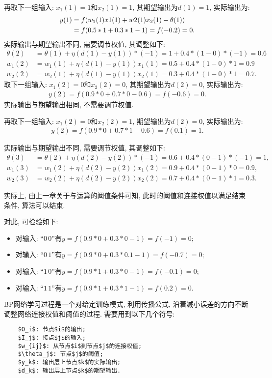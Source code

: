 再取下一组输入: $x_1(1)=1$和$x_2(1)=1$, 其期望输出为$d(1)=1$, 实际输出为:
\begin{align}
  y(1)&=f(w_1(1) x1(1)+ w2(1) x_2(1)-\theta(1))\notag\\
      &=f(0.5*1+0.3*1-1)=f(-0.2)=0.
\end{align}
实际输出与期望输出不同, 需要调节权值, 其调整如下:
\begin{align}
\theta(2)&=\theta(1)+\eta (d(1)- y(1))*(-1)=1+0.4*(1-0)*(-1)=0.6\\
    w_1(2)&=w_1(1)+\eta (d(1)- y(1))x_1(1)=0.5+0.4*(1-0)*1=0.9\\
    w_2(2)&=w_2(1)+\eta (d(1)- y(1))x_2(1)=0.3+0.4*(1-0)*1=0.7.
\end{align}
取下一组输入: $x_1(2)=0$和$x_2(2)=0$, 其期望输出为$d(2)=0$, 实际输出为:
\begin{align}
    y(2)=f(0.9*0+0.7*0-0.6)=f(-0.6)=0.
\end{align}
实际输出与期望输出相同, 不需要调节权值.

再取下一组输入: $x_1(2)=0$和$x_2(2)=1$, 期望输出为$d(2)=0$, 实际输出为:
\begin{align}
  y(2)=f(0.9*0+0.7*1-0.6)=f(0.1)=1.
\end{align}

实际输出与期望输出不同, 需要调节权值, 其调整如下:
\begin{align}
\theta(3)&=\theta(2)+\eta (d(2)- y(2))*(-1)=0.6+0.4*(0-1)*(-1)=1,\\
   w_1(3)&=w_1(2)+\eta (d(2)- y(2))x_1(2)=0.9+0.4*(0-1)*0=0.9,\\
   w_2(3)&=w_2(2)+\eta (d(2)- y(2))x_2(2)=0.7+0.4*(0-1)*1=0.3.
\end{align}

实际上, 由上一章关于与运算的阈值条件可知, 此时的阈值和连接权值以满足结束条件, 算法可以结束.

对此, 可检验如下:
\begin{itemize}
\item 对输入: “$0\, 0$”有$y=f(0.9*0+0.3*0-1)=f(-1)=0$;
\item 对输入: “$0\, 1$”有$y=f(0.9*0+0.3*0.1-1)=f(-0.7)=0$;
\item 对输入: “$1\, 0$”有$y=f(0.9*1+0.3*0-1)=f(-0.1)=0$;
\item 对输入: “$1\, 1$”有$y=f(0.9*1+0.3*1-1)=f(0.2)=0$.
\end{itemize}

BP网络学习过程是一个对给定训练模式, 利用传播公式, 沿着减小误差的方向不断调整网络连接权值和阈值的过程. 需要用到以下几个符号:
\begin{Verbatim}
    $O_i$: 节点$i$的输出;
    $I_j$: 接点$j$的输入;
    $w_{ij}$: 从节点$i$到节点$j$的连接权值;
    $\theta_j$: 节点$j$的阈值;
    $y_k$: 输出层上节点$k$的实际输出;
    $d_k$: 输出层上节点$k$的期望输出.
\end{Verbatim}


